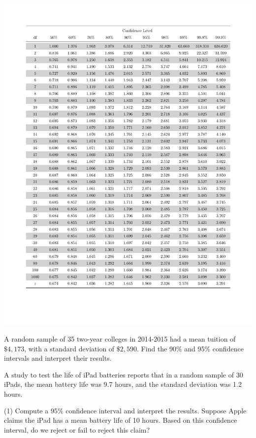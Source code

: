 \documentclass[../mathNotesPreamble]{subfiles}
\begin{document}
    \begin{center}
      \vspace*{-4\baselineskip}
      \includegraphics[width=\linewidth]{t_score_table}
    \end{center}
    \pagebreak

    \begin{ex*}
      A random sample of 35 two-year colleges in 2014-2015 had a mean tuition of $\$4,173$, with a standard deviation of $\$2,590$. Find the 90\% and 95\% confidence intervals and interpret their results.
    \end{ex*}

    \begin{ex*}
      A study to test the life of iPad batteries reports that in a random sample of 30 iPads, the mean battery life was 9.7 hours, and the standard deviation was 1.2 hours.
    \end{ex*}
    \begin{extasks}[after-item-skip=\stretch{1}](1)
      \task Compute a 95\% confidence interval and interpret the results.
      \task Suppose Apple claims the iPad has a mean battery life of 10 hours. Based on this confidence interval, do we reject or fail to reject this claim?
    \end{extasks}
    \pagebreak
\end{document}
